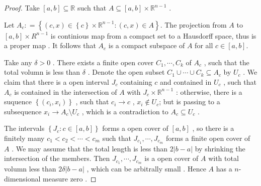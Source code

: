 \documentclass[../main.tex]{subfiles}
\begin{document}
\begin{proof}
    Take \(  [a,b]\subseteq \mathbb{R}   \) such that \(  A\subseteq \left[ a,b \right]\times \mathbb{R} ^{n-1}   \) .
    
    Let \(  A_{c}: =  \left\{ \left( c,x \right) \in \left\{ c \right\}\times \mathbb{R} ^{n-1}: \left( c,x \right) \in A   \right\}  \). The projection from \(  A  \) to  \(  \left[ a,b \right]\times R^{n-1}   \) is continious map from a compact set to a Hausdorff space, thus is a proper map . It follows that \(  A_{c}  \) is a compact subspace of \(  A  \) for all  \(  c \in \left[ a,b \right]   \). 
    
    Take any \(   \delta > 0  \) .  There exists a finite open cover \(  C_1,\cdots ,C_{k}  \) of \(  A_{c}  \) , such that the total volumn is less than \(   \delta    \) . Denote the open subset \(  C_1\cup \cdots \cup C_{k}\subseteq A_{c}  \) by \(  U_{c}  \) .   We claim that  there is a open interval \(  J_{c}  \)  containing \(  c  \) and contained in \(  U_{c}  \) , such that   \(  A_{c}  \) is contained in the intersection of \(  A  \) with \(  J_{c}\times \mathbb{R} ^{n-1}  \) : otherwise, there is a suquence \(  \left\{ \left( c_{i},x_{i} \right)  \right\}  \) , such that \(  c_{i}\to c  \) , \(  x_{i}\not\in  U_{c}  \); but is passing to a subsequence \(  x_{i}\to A_{c}\setminus U_{c}  \) , which is a contradiction to \(  A_{c}\subseteq U_{c}  \) .   
    
    The intervals \(  \left\{ J_{c}: c \in \left[ a,b \right]  \right\}  \) forms a open cover of \(  \left[ a,b \right]   \) , so there is a finitely many \(  c_1< c_2< \cdots < c_{m}  \) such that \(  J_{c_1},\cdots ,J_{c_{m}}  \) forms a finite open cover of \(  A  \) . We may assume that the total length is less than \(  2\left| b-a \right|   \) by shrinking  the intersection of the members. Then \(  J_{c_1},\cdots ,J_{c_{m}}  \)      is a open cover of  \(  A  \) with total volumn less than \(  2 \delta \left| b-a \right|   \) , which can be arbitrally small . Hence \(  A   \) has a \(  n  \)- dimensional measure zero .   
\end{proof}
\end{document}

